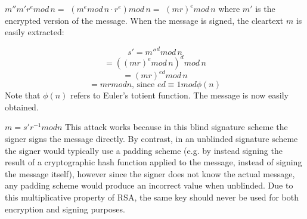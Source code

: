 \documentclass{article}
\begin{document}
$ m''m'r^{e}{mod\, {n}}= $
$(m^{e}{ mod\, {n}}\cdot r^{e}){ mod\, {n}}=$
$(mr)^{e}{ mod\, {n}}$
where ${ m'}$ is the encrypted version of the message. When the message is signed, the cleartext ${ m}$ is easily extracted:

\[ s'=m''^{d}{ mod\, {n}} \] 
\[=((mr)^{e}{ mod\, {n}})^{d}{ mod\, {n}}\]
\[=(mr)^{ed}{mod\, {n}}\]
\[=m r{ mod {n}}{\mbox{, since }}ed\equiv 1 {mod {\phi (n)}}\]
Note that ${ \phi (n)}$ refers to Euler's totient function. The message is now easily obtained.

${ m=s' r^{-1}{ mod {n}}}$
This attack works because in this blind signature scheme the signer signs the message directly. By contrast, in an unblinded signature scheme the signer would typically use a padding scheme (e.g. by instead signing the result of a cryptographic hash function applied to the message, instead of signing the message itself), however since the signer does not know the actual message, any padding scheme would produce an incorrect value when unblinded. Due to this multiplicative property of RSA, the same key should never be used for both encryption and signing purposes.
\end{document}
